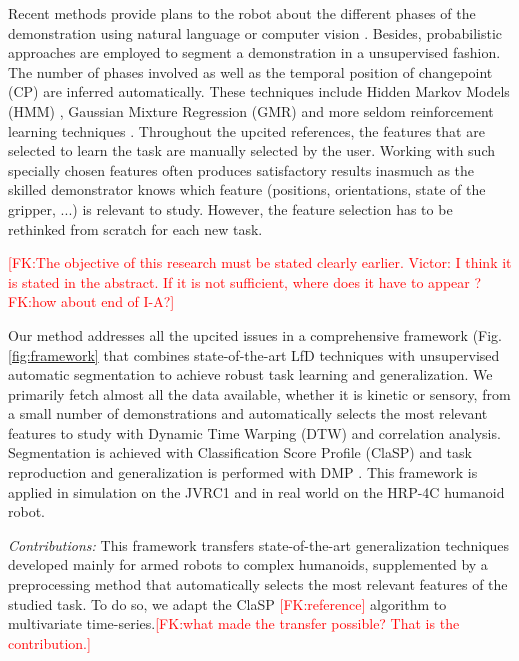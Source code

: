 \documentclass[conference]{IEEEtran}
\newcommand{\fk}[1]{\textcolor{red}{[FK:#1]}}
\begin{document}
Recent methods provide plans to the robot about the different phases of the demonstration using natural language or computer vision \cite{caccavale_kinesthetic_2019} \cite{saran_enhancing_2019}. Besides, probabilistic approaches are employed to segment a demonstration in a unsupervised fashion. The number of phases involved as well as the temporal position of changepoint (CP) are inferred automatically. These techniques include Hidden Markov Models (HMM) \cite{niekum_learning_2015}, Gaussian Mixture Regression (GMR) \cite{calinon_learning_2010} \cite{calinon_learning_2007} and more seldom reinforcement learning techniques \cite{kroemer_towards_2015}. Throughout the upcited references, the features that are selected to learn the task are manually selected by the user. Working with such specially chosen features often produces satisfactory results inasmuch as the skilled demonstrator knows which feature (positions, orientations, state of the gripper, ...) is relevant to study. However, the feature selection has to be rethinked from scratch for each new task. \newline

\fk{The objective of this research must be stated clearly earlier. \newline
Victor: I think it is stated in the abstract. If it is not sufficient, where does it have to appear ?\newline FK:how about end of I-A?}


Our method addresses all the upcited issues in a comprehensive framework (Fig. \ref{fig:framework} that combines state-of-the-art LfD techniques with unsupervised automatic segmentation to achieve robust task learning and generalization. We primarily fetch almost all the data available, whether it is kinetic  or sensory, from a small number of demonstrations and automatically selects the most relevant features to study with Dynamic Time Warping (DTW) \cite{dtw} and correlation analysis. Segmentation is achieved with Classification Score Profile (ClaSP) \cite{clasp} and task reproduction and generalization is performed with DMP \cite{ijspeert_movement_2002} \cite{ijspeert_dynamical_2013}. This framework is applied in simulation on the JVRC1 \cite{jvrc} and in real world on the HRP-4C \cite{hrp4} humanoid robot.

\textit{Contributions:} 
This framework transfers state-of-the-art generalization techniques developed mainly for armed robots to complex humanoids, supplemented by a preprocessing method that automatically selects the most relevant features of the studied task. To do so, we adapt the ClaSP \cite{Cl}\fk{reference} algorithm to multivariate time-series.\fk{what made the transfer possible? That is the contribution.}
\end{document}
